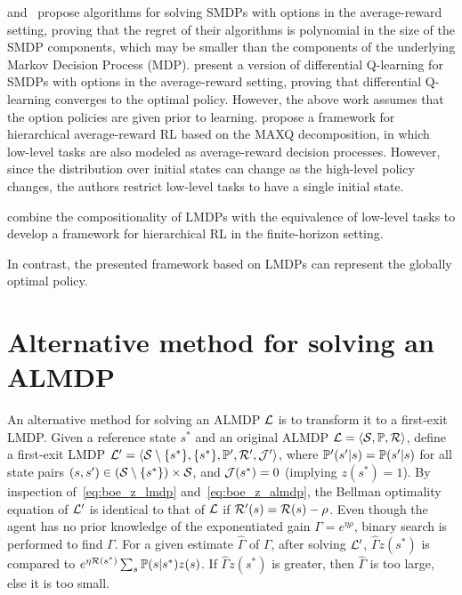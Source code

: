 \citet{Fruit2017} and~\cite{Fruit2017b} propose algorithms for solving SMDPs with options in the average-reward setting, proving that the regret of their algorithms is polynomial in the size of the SMDP components, which may be smaller than the components of the underlying Markov Decision Process (MDP).
\citet{Wan2021a} present a version of differential Q-learning for SMDPs with options in the average-reward setting, proving that differential Q-learning converges to the optimal policy.
However, the above work assumes that the option policies are given prior to learning.
\citet{Ghavamzadeh2007} propose a framework for hierarchical average-reward RL based on the MAXQ decomposition, in which low-level tasks are also modeled as average-reward decision processes.
However, since the distribution over initial states can change as the high-level policy changes, the authors restrict low-level tasks to have a single initial state.

\citet{Infante2022} combine the compositionality of LMDPs with the equivalence of low-level tasks to develop a framework for hierarchical RL in the finite-horizon setting.

In contrast, the presented framework based on LMDPs can represent the globally optimal policy.

\section{Alternative method for solving an ALMDP}

An alternative method for solving an ALMDP $\mathcal{L}$ is to transform it to a first-exit LMDP. 
Given a reference state $s^*$ and an original ALMDP $\mathcal{L}=\langle\mathcal{S},\mathbb{P},\mathcal{R}\rangle$, define a first-exit LMDP $\mathcal{L}'=\langle\mathcal{S}\setminus\{s^*\},\{s^*\}, \mathbb{P}',\mathcal{R}',\mathcal{J}'\rangle$, where $\mathbb{P}'(s'|s)=\mathbb{P}(s'|s)$ for all state pairs $(s,s')\in(\mathcal{S}\setminus\{s^*\})\times\mathcal{S}$, and $\mathcal{J}(s^*)=0$ (implying $z(s^*)=1$). By inspection of~\eqref{eq:boe_z_lmdp} and~\eqref{eq:boe_z_almdp}, the Bellman optimality equation of $\mathcal{L}'$ is identical to that of $\mathcal{L}$ if $\mathcal{R}'(s)=\mathcal{R}(s)-\rho$. Even though the agent has no prior knowledge of the exponentiated gain $\Gamma = e^{\eta\rho}$, binary search is performed to find $\Gamma$. For a given estimate $\widehat\Gamma$ of $\Gamma$, after solving $\mathcal{L}'$, $\widehat \Gamma z(s^*)$ is compared to $e^{\eta\mathcal{R}(s^*)}\sum_s\mathbb{P}(s|s^*)z(s)$. If $\widehat \Gamma z(s^*)$ is greater, then $\widehat\Gamma$ is too large, else it is too small.

